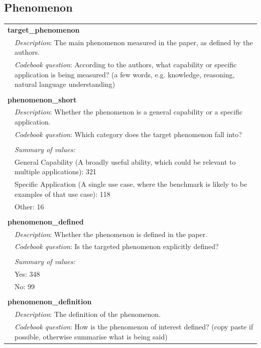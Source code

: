 \subsection{\textcolor{phenomenon}{Phenomenon}}
{\small\begin{longtable}{p{}p{}}
\multicolumn{2}{l}{\textbf{target\_phenomenon}} \\
& \textit{Description}: The main phenomenon measured in the paper, as defined by the authors. \\
& \textit{Codebook question}: According to the authors, what capability or specific application is being measured? (a few words, e.g. knowledge, reasoning, natural language understanding) \\
\\
\multicolumn{2}{l}{\textbf{phenomenon\_short}} \\
& \textit{Description}: Whether the phenomenon is a general capability or a specific application. \\
& \textit{Codebook question}: Which category does the target phenomenon fall into? \\
\\
& \textit{Summary of values:} \\
& General Capability (A broadly useful ability, which could be relevant to multiple applications): 321 \\
& Specific Application (A single use case, where the benchmark is likely to be examples of that use case): 118 \\
& Other: 16 \\
\\
\multicolumn{2}{l}{\textbf{phenomenon\_defined}} \\
& \textit{Description}: Whether the phenomenon is defined in the paper. \\
& \textit{Codebook question}: Is the targeted phenomenon explicitly defined? \\
\\
& \textit{Summary of values:} \\
& Yes: 348 \\
& No: 99 \\
\\
\multicolumn{2}{l}{\textbf{phenomenon\_definition}} \\
& \textit{Description}: The definition of the phenomenon. \\
& \textit{Codebook question}: How is the phenomenon of interest defined? (copy paste if possible, otherwise summarise what is being said) \\

\end{longtable}}

